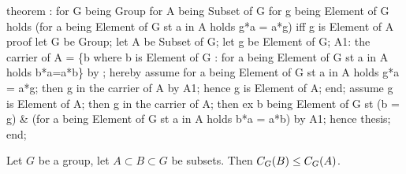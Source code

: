 \nwenddocs{}\endmoddef\nwstartdeflinemarkup{}\nwenddeflinemarkup
theorem :
  for G being Group
  for A being Subset of G
  for g being Element of G
  holds (for a being Element of G st a in A holds g*a = a*g) iff
        g is Element of  A
proof
  let G be Group;
  let A be Subset of G;
  let g be Element of G;
A1: the carrier of  A = \{b where b is Element of G : for a
  being Element of G st a in A holds b*a=a*b\} by ;
  hereby
    assume for a being Element of G st a in A holds g*a = a*g;
    then g in the carrier of  A by A1;
    hence g is Element of  A;
  end;
  assume g is Element of  A;
  then g in the carrier of  A;
  then ex b being Element of G st (b = g) & (for a being Element of G st a in A
  holds b*a = a*b) by A1;
  hence thesis;
end;
\eatline
{}\nwendcode{}\nwdocspar

\begin{theorem}
  Let $G$ be a group, let $A\subset B\subset G$ be subsets.
  Then $C_{G}(B)\leq C_{G}(A)$.
\end{theorem}

